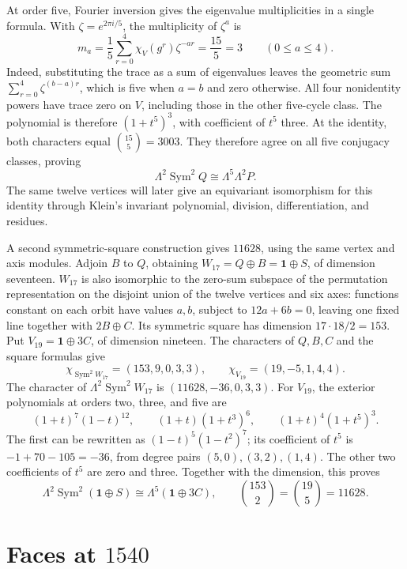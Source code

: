 \documentclass[11pt,a4paper]{article}
\begin{document}
At order five, Fourier inversion gives the eigenvalue multiplicities in a single formula. With \(\zeta=e^{2\pi i/5}\), the multiplicity of \(\zeta^a\) is
\[
m_a=\frac15\sum_{r=0}^{4}\chi_V(g^r)\zeta^{-ar}
     =\frac{15}{5}=3\qquad(0\leq a\leq4).
\]
Indeed, substituting the trace as a sum of eigenvalues leaves the geometric sum \(\sum_{r=0}^{4}\zeta^{(b-a)r}\), which is five when \(a=b\) and zero otherwise. All four nonidentity powers have trace zero on \(V\), including those in the other five-cycle class. The polynomial is therefore \((1+t^5)^3\), with coefficient of \(t^5\) three. At the identity, both characters equal $\binom{15}{5}=3003$. They therefore agree on all five conjugacy classes, proving
\begin{equation}\label{eq:icosahedral}
\boxed{\Lambda^2\operatorname{Sym}^2Q\cong\Lambda^5\Lambda^2P.}
\end{equation}
The same twelve vertices will later give an equivariant isomorphism for this identity through Klein's invariant polynomial, division, differentiation, and residues.

A second symmetric-square construction gives \(11628\), using the same vertex and axis modules. Adjoin \(B\) to \(Q\), obtaining \(W_{17}=Q\oplus B=\mathbf1\oplus S\), of dimension seventeen. \(W_{17}\) is also isomorphic to the zero-sum subspace of the permutation representation on the disjoint union of the twelve vertices and six axes: functions constant on each orbit have values \(a,b\), subject to \(12a+6b=0\), leaving one fixed line together with \(2B\oplus C\). Its symmetric square has dimension \(17\cdot18/2=153\). Put \(V_{19}=\mathbf1\oplus3C\), of dimension nineteen. The characters of $Q,B,C$ and the square formulas give
\[
\chi_{\operatorname{Sym}^2W_{17}}=(153,9,0,3,3),\qquad
\chi_{V_{19}}=(19,-5,1,4,4).
\]
The character of \(\Lambda^2\operatorname{Sym}^2W_{17}\) is \((11628,-36,0,3,3)\). For \(V_{19}\), the exterior polynomials at orders two, three, and five are
\[
(1+t)^7(1-t)^{12},\qquad
(1+t)(1+t^3)^6,\qquad
(1+t)^4(1+t^5)^3.
\]
The first can be rewritten as \((1-t)^5(1-t^2)^7\); its coefficient of \(t^5\) is \(-1+70-105=-36\), from degree pairs \((5,0),(3,2),(1,4)\). The other two coefficients of \(t^5\) are zero and three. Together with the dimension, this proves
\[
\Lambda^2\operatorname{Sym}^2(\mathbf1\oplus S)
\cong\Lambda^5(\mathbf1\oplus3C),\qquad
\binom{153}{2}=\binom{19}{5}=11628.
\]

\section[Faces at 1540]{Faces at $1540$}\label{sec:faces}
\end{document}

